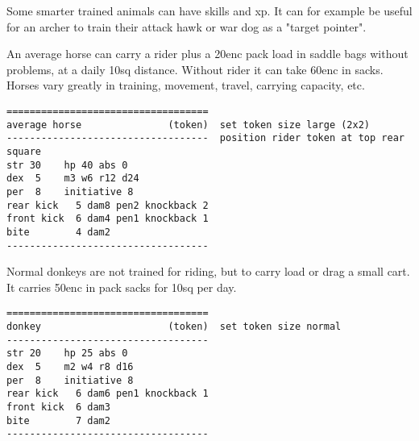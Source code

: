 Some smarter trained animals can have skills and xp.
It can for example be useful for an archer to train their attack hawk or war dog as a "target pointer".



\openitemslist

An average horse can carry a rider plus a 20enc pack load in saddle bags without problems, at a daily 10sq distance. Without rider it can take 60enc in sacks. Horses vary greatly in training, movement, travel, carrying capacity, etc.
\small \begin{samepage} \begin{verbatim}
===================================
average horse               (token)  set token size large (2x2)
-----------------------------------  position rider token at top rear square
str 30    hp 40 abs 0
dex  5    m3 w6 r12 d24
per  8    initiative 8
rear kick   5 dam8 pen2 knockback 2
front kick  6 dam4 pen1 knockback 1
bite        4 dam2
-----------------------------------
\end{verbatim} \end{samepage} \normalsize


Normal donkeys are not trained for riding, but to carry load or drag a small cart. It carries 50enc in pack sacks for 10sq per day.
\small \begin{samepage} \begin{verbatim}
===================================
donkey                      (token)  set token size normal
-----------------------------------
str 20    hp 25 abs 0
dex  5    m2 w4 r8 d16
per  8    initiative 8
rear kick   6 dam6 pen1 knockback 1
front kick  6 dam3
bite        7 dam2
-----------------------------------
\end{verbatim} \end{samepage} \normalsize


